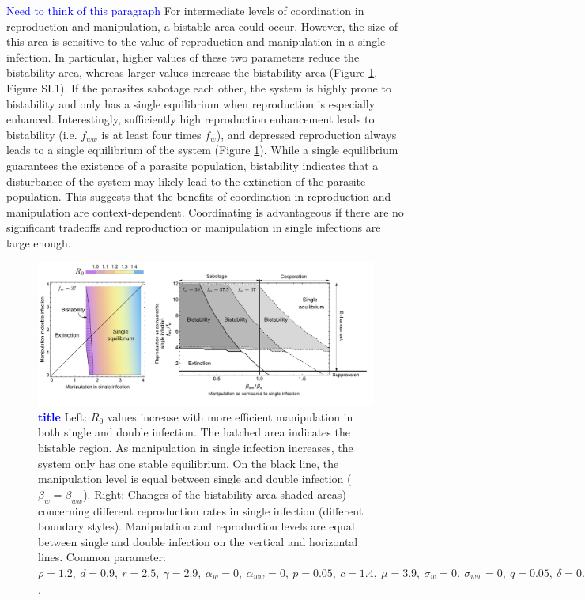 \documentclass[a4paper]{scrartcl}
\newcommand{\cha}[1]{\textcolor{blue}{#1}}
\begin{document}
\cha{Need to think of this paragraph}
For intermediate levels of coordination in reproduction and manipulation, a bistable area could occur.
However, the size of this area is sensitive to the value of reproduction and manipulation in a single infection. 
In particular, higher values of these two parameters reduce the bistability area, whereas larger values increase the bistability area (Figure \ref{fig:manipbifur}, Figure SI.1).
If the parasites sabotage each other, the system is highly prone to bistability and only has a single equilibrium when reproduction is especially enhanced.
Interestingly, sufficiently high reproduction enhancement leads to bistability (i.e. $f_{ww}$ is at least four times $f_w$), and depressed reproduction always leads to a single equilibrium of the system (Figure \ref{fig:manipbifur}). 
While a single equilibrium guarantees the existence of a parasite population, bistability indicates that a disturbance of the system may likely lead to the extinction of the parasite population. 
This suggests that the benefits of coordination in reproduction and manipulation are context-dependent. 
Coordinating is advantageous if there are no significant tradeoffs and reproduction or manipulation in single infections are large enough. 

\begin{figure}[!ht]
\captionsetup{format=plain}
\centering
\includegraphics[width=\textwidth]{Figures/ratio_reproduction_manipulation_combi.pdf}
\caption{\cha{\textbf{title}}
Left: $R_0$ values increase with more efficient manipulation in both single and double infection.  The hatched area indicates the bistable region. 
As manipulation in single infection increases, the system only has one stable equilibrium. 
On the black line, the manipulation level is equal between single and double infection ($\beta_w = \beta_{ww}$). 
Right: Changes of the bistability area shaded areas) concerning different reproduction rates in single infection (different boundary styles). 
Manipulation and reproduction levels are equal between single and double infection on the vertical and horizontal lines. 
Common parameter:  $\rho = 1.2, \ d = 0.9, \ r = 2.5, \ \gamma = 2.9, \ \alpha_w = 0, \ \alpha_{ww} = 0, \ p = 0.05, \ c = 1.4, \ \mu = 3.9, \ \sigma_w = 0, \ \sigma_{ww} = 0, \ q = 0.05, \ \delta = 0.9, \ k = 0.26, \  \beta_w = 1.65, h = 0.6$.}
\label{fig:manipbifur}
\end{figure}
\end{document}
